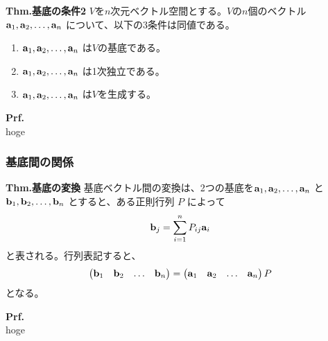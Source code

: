 \documentclass[a4paper,11pt]{jsarticle}
\numberwithin{equation}{section}
\begin{document}
\begin{itembox}[l]{\textbf{Thm.基底の条件2}}
  $V$を$n$次元ベクトル空間とする。$V$の$n$個のベクトル$\vb{a}_1, \vb{a}_2, \dots, \vb{a}_n$ について、以下の3条件は同値である。
  \begin{enumerate}
    \item $\vb{a}_1, \vb{a}_2, \dots, \vb{a}_n$ は$V$の基底である。
    \item $\vb{a}_1, \vb{a}_2, \dots, \vb{a}_n$ は1次独立である。
    \item $\vb{a}_1, \vb{a}_2, \dots, \vb{a}_n$ は$V$を生成する。
  \end{enumerate}
\end{itembox}
\textbf{Prf.}\\
hoge\hfill\qedsymbol\\


\subsubsection{基底間の関係}
\begin{itembox}[l]{\textbf{Thm.基底の変換}}
  基底ベクトル間の変換は、2つの基底を$\vb{a}_1, \vb{a}_2, \dots, \vb{a}_n$ と $\vb{b}_1, \vb{b}_2, \dots, \vb{b}_n$ とすると、ある正則行列 $P$ によって 
  \begin{align}
    \vb{b}_j = \sum_{i=1}^{n} P_{ij} \vb{a}_i
  \end{align}
  と表される。行列表記すると、
  \begin{align}
    \begin{pmatrix}
      \vb{b}_1 & \vb{b}_2 & \dots & \vb{b}_n
    \end{pmatrix}
    =
    \begin{pmatrix}
      \vb{a}_1 & \vb{a}_2 & \dots & \vb{a}_n
    \end{pmatrix}
    P
  \end{align}
  となる。
\end{itembox}
\textbf{Prf.}\\
hoge\hfill\qedsymbol\\
\end{document}
